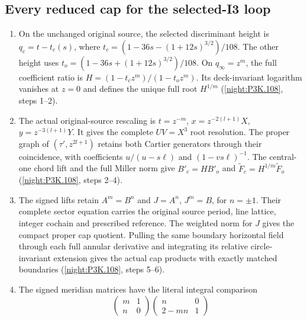 \subsection{Every reduced cap for the selected-I3 loop}
\RungOne
\begin{enumerate}[label=\arabic*.]
\item On the unchanged original source, the selected discriminant
  height is $q_c=t-t_c(s)$, where
  $t_c=(1-36s-(1+12s)^{3/2})/108$.
  The other height uses
  $t_o=(1-36s+(1+12s)^{3/2})/108$.
  On $q_\infty=z^m$, the full coefficient ratio is
  $H=(1-t_cz^m)/(1-t_oz^m)$. Its deck-invariant logarithm
  vanishes at $z=0$ and defines the unique full root $H^{1/m}$
  (\cref{night:P3K.108}, steps 1--2).
\item The actual original-source rescaling is
  $t=z^{-m}$, $x=z^{-2(l+1)}X$, $y=z^{-3(l+1)}Y$.
  It gives the complete $UV=X^3$ root resolution. The proper
  graph of $(\tau',z^{2l+1})$ retains both Cartier generators
  through their coincidence, with coefficients
  $u/(u-s\ell)$ and $(1-vs\ell)^{-1}$.
  The central-one chord lift and the full Miller norm give
  $B'_c=HB'_o$ and
  $\widetilde F_c=H^{1/m}\widetilde F_o$
  (\cref{night:P3K.108}, steps 2--4).
\item The signed lifts retain $A^m=B^n$ and
  $J=A^n$, $J^m=B$, for $n=\pm1$.
  Their complete sector equation carries the original source
  period, line lattice, integer cochain and prescribed reference.
  The weighted norm for $J$ gives the compact proper cap
  quotient. Pulling the same boundary horizontal field through
  each full annular derivative and integrating its relative
  circle-invariant extension gives the actual cap products
  with exactly matched boundaries
  (\cref{night:P3K.108}, steps 5--6).
\item The signed meridian matrices have the literal integral
  comparison
  \[
  \begin{pmatrix}m&1\\n&0\end{pmatrix}
  \begin{pmatrix}n&0\\2-mn&1\end{pmatrix}
\]
\end{enumerate}
